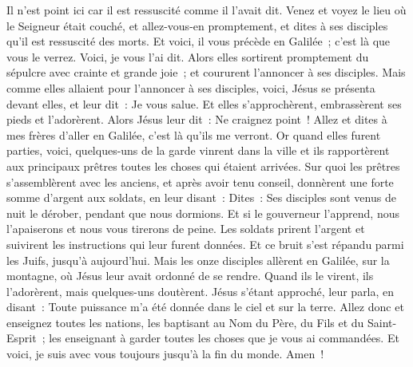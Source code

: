 \begin{multicols}{2}
Il n'est point ici car il est ressuscité comme il l'avait dit. Venez et voyez le lieu où le Seigneur était couché,
et allez-vous-en promptement, et dites à ses disciples qu'il est ressuscité des morts. Et voici, il vous précède en Galilée~; c'est là que vous le verrez. Voici, je vous l'ai dit.
Alors elles sortirent promptement du sépulcre avec crainte et grande joie~; et coururent l'annoncer à ses disciples.
Mais comme elles allaient pour l'annoncer à ses disciples, voici, Jésus se présenta devant elles, et leur dit~: Je vous salue. Et elles s'approchèrent, embrassèrent ses pieds et l'adorèrent.
Alors Jésus leur dit~: Ne craignez point~! Allez et dites à mes frères d'aller en Galilée, c'est là qu'ils me verront.
 Or quand elles furent parties, voici, quelques-uns de la garde vinrent dans la ville et ils rapportèrent aux principaux prêtres toutes les choses qui étaient arrivées.
Sur quoi les prêtres s'assemblèrent avec les anciens, et après avoir tenu conseil, donnèrent une forte somme d'argent aux soldats,
en leur disant~: Dites~: Ses disciples sont venus de nuit le dérober, pendant que nous dormions.
Et si le gouverneur l'apprend, nous l'apaiserons et nous vous tirerons de peine.
Les soldats prirent l'argent et suivirent les instructions qui leur furent données. Et ce bruit s'est répandu parmi les Juifs, jusqu'à aujourd'hui.
Mais les onze disciples allèrent en Galilée, sur la montagne, où Jésus leur avait ordonné de se rendre.
Quand ils le virent, ils l'adorèrent, mais quelques-uns doutèrent.
Jésus s'étant approché, leur parla, en disant~: Toute puissance m'a été donnée dans le ciel et sur la terre.
Allez donc et enseignez toutes les nations, les baptisant au Nom du Père, du Fils et du Saint-Esprit~;
les enseignant à garder toutes les choses que je vous ai commandées. Et voici, je suis avec vous toujours jusqu'à la fin du monde. Amen~!
\PPE{}
\end{multicols}

